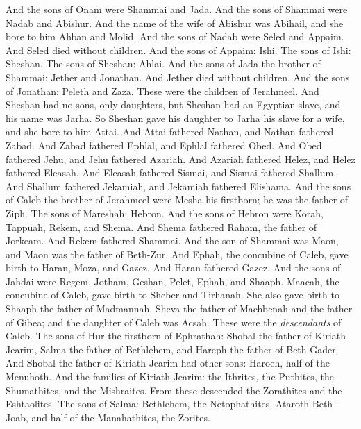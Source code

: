\begin{biblechapter}
\verse And the sons of Onam were Shammai and Jada. And the sons of Shammai were Nadab and Abishur.
\verse And the name of the wife of Abishur was Abihail, and she bore to him Ahban and Molid.
\verse And the sons of Nadab were Seled and Appaim. And Seled died without children.
\verse And the sons of Appaim: Ishi. The sons of Ishi: Sheshan. The sons of Sheshan: Ahlai.
\verse And the sons of Jada the brother of Shammai: Jether and Jonathan. And Jether died without children.
\verse And the sons of Jonathan: Peleth and Zaza. These were the children of Jerahmeel.
\verse And Sheshan had no sons, only daughters, but Sheshan had an Egyptian slave, and his name was Jarha.
\verse So Sheshan gave his daughter to Jarha his slave for a wife, and she bore to him Attai.
\verse And Attai fathered Nathan, and Nathan fathered Zabad.
\verse And Zabad fathered Ephlal, and Ephlal fathered Obed.
\verse And Obed fathered Jehu, and Jehu fathered Azariah.
\verse And Azariah fathered Helez, and Helez fathered Eleasah.
\verse And Eleasah fathered Sismai, and Sismai fathered Shallum.
\verse And Shallum fathered Jekamiah, and Jekamiah fathered Elishama.
\verse And the sons of Caleb the brother of Jerahmeel were Mesha his firstborn; he was the father of Ziph. The sons of Mareshah: Hebron.
\verse And the sons of Hebron were Korah, Tappuah, Rekem, and Shema.
\verse And Shema fathered Raham, the father of Jorkeam. And Rekem fathered Shammai.
\verse And the son of Shammai was Maon, and Maon was the father of Beth-Zur.
\verse And Ephah, the concubine of Caleb, gave birth to Haran, Moza, and Gazez. And Haran fathered Gazez.
\verse And the sons of Jahdai were Regem, Jotham, Geshan, Pelet, Ephah, and Shaaph.
\verse Maacah, the concubine of Caleb, gave birth to Sheber and Tirhanah.
\verse She also gave birth to Shaaph the father of Madmannah, Sheva the father of Machbenah and the father of Gibea; and the daughter of Caleb was Acsah.
\verse These were the \textit{descendants} of Caleb.
\verse The sons of Hur the firstborn of Ephrathah: Shobal the father of Kiriath-Jearim,
\verse Salma the father of Bethlehem, and Hareph the father of Beth-Gader.
\verse And Shobal the father of Kiriath-Jearim had other sons: Haroeh, half of the Menuhoth.
\verse And the families of Kiriath-Jearim: the Ithrites, the Puthites, the Shumathites, and the Mishraites. From these descended the Zorathites and the Eshtaolites.
\verse The sons of Salma: Bethlehem, the Netophathites, Ataroth-Beth-Joab, and half of the Manahathites, the Zorites.
\end{biblechapter}

